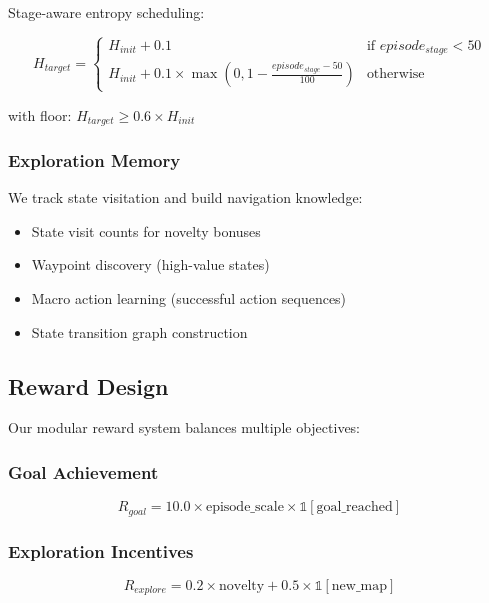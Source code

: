 \documentclass[12pt,a4paper]{article}
\begin{document}
Stage-aware entropy scheduling:

\begin{equation}
H_{target} = \begin{cases}
H_{init} + 0.1 & \text{if } episode_{stage} < 50 \\
H_{init} + 0.1 \times \max(0, 1 - \frac{episode_{stage} - 50}{100}) & \text{otherwise}
\end{cases}
\end{equation}

with floor: $H_{target} \geq 0.6 \times H_{init}$

\subsubsection{Exploration Memory}

We track state visitation and build navigation knowledge:

\begin{itemize}
    \item State visit counts for novelty bonuses
    \item Waypoint discovery (high-value states)
    \item Macro action learning (successful action sequences)
    \item State transition graph construction
\end{itemize}

\subsection{Reward Design}

Our modular reward system balances multiple objectives:

\subsubsection{Goal Achievement}
\begin{equation}
R_{goal} = 10.0 \times \text{episode\_scale} \times \mathbb{1}[\text{goal\_reached}]
\end{equation}

\subsubsection{Exploration Incentives}
\begin{equation}
R_{explore} = 0.2 \times \text{novelty} + 0.5 \times \mathbb{1}[\text{new\_map}]
\end{equation}
\end{document}
